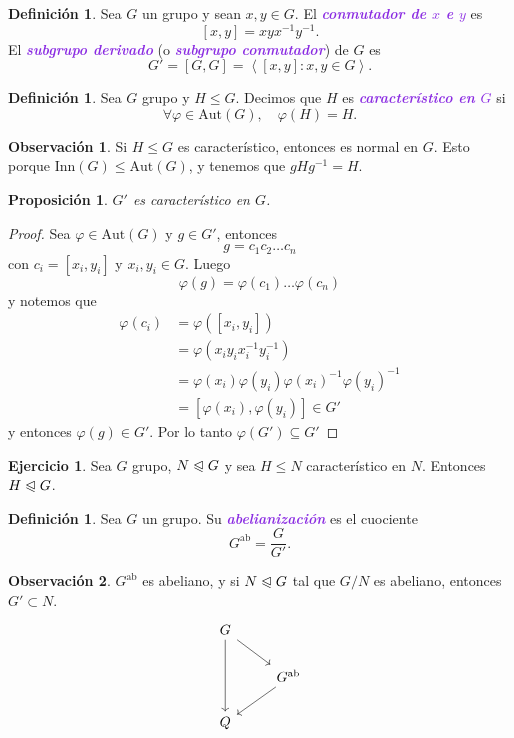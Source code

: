 \documentclass{article}
\newtheorem{proposition}[theorem]{Proposición}
\theoremstyle{definition}
\newtheorem{definition}[theorem]{Definición}
\newtheorem{exercise}{Ejercicio}
\newtheorem*{obs}{Observación}
\theoremstyle{remark}
\numberwithin{equation}{section}
\newcommand{\vphi}{\varphi}
\newcommand{\normal}{\trianglelefteqslant}
\newcommand{\Aut}{\mathrm{Aut}}
\newcommand{\Inn}{\mathrm{Inn}}
\newcommand{\ab}{\mathrm{ab}}
\newcommand{\gen}[1]{\left\langle #1 \right\rangle}
\newcommand{\wea}[1]{\textcolor{BlueViolet}{\textbf{\emph{#1}}}}
\begin{document}
\begin{definition}
  Sea $G$ un grupo y sean $x,y \in G$. El \wea{conmutador de $x$ e $y$} es
  \[[x,y] = xyx^{-1}y^{-1}.\]
  El \wea{subgrupo derivado} (o \wea{subgrupo conmutador}) de $G$ es
  \[G' = [G,G] = \gen{[x,y] \colon x,y \in G}.\]
\end{definition}

\begin{definition}
  Sea $G$ grupo y $H \leqslant G$. Decimos que $H$ es \wea{característico en $G$} si $$\forall \vphi \in \Aut(G), \quad \vphi(H) = H.$$
\end{definition}

\begin{obs}
  Si $H \leqslant G$ es característico, entonces es normal en $G$. Esto porque $\Inn(G) \leqslant \Aut(G)$, y tenemos que $gHg^{-1} = H$.
\end{obs}

\begin{proposition}
  $G'$ es característico en $G$.
\end{proposition}
\begin{proof}
  Sea $\vphi \in \Aut(G)$ y $g \in G'$, entonces $$g = c_1 c_2 \dots c_n$$ con $c_i = [x_i,y_i]$ y $x_i,y_i \in G$. Luego
  \[\vphi(g) = \vphi(c_1) \dots \vphi(c_n)\]
  y notemos que
  \begin{align*}
    \vphi(c_i) &= \vphi([x_i,y_i]) \\
    &= \vphi(x_i y_i x_i^{-1} y_i^{-1}) \\
    &= \vphi(x_i) \vphi(y_i) \vphi(x_i)^{-1} \vphi(y_i)^{-1} \\
    &= [\vphi(x_i), \vphi(y_i)] \in G'
  \end{align*}
  y entonces $\vphi(g) \in G'$. Por lo tanto $\vphi(G') \subseteq G'$
\end{proof}

\begin{exercise}
  Sea $G$ grupo, $N \normal G$ y sea $H \leqslant N$ característico en $N$. Entonces $H \normal G$.
\end{exercise}

\begin{definition}
  Sea $G$ un grupo. Su \wea{abelianización} es el cuociente
  \[G^\ab = \frac{G}{G'}.\]
\end{definition}

\begin{obs}
  $G^\ab$ es abeliano, y si $N \normal G$ tal que $G/N$ es abeliano, entonces $G' \subset N$.
  \[\begin{tikzcd}
    G & \\
    & {G^\ab} \\
    Q
    \arrow[from=1-1, to=2-2]
    \arrow[from=1-1, to=3-1]
    \arrow[from=2-2, to=3-1]
  \end{tikzcd}\]
\end{obs}
\end{document}
